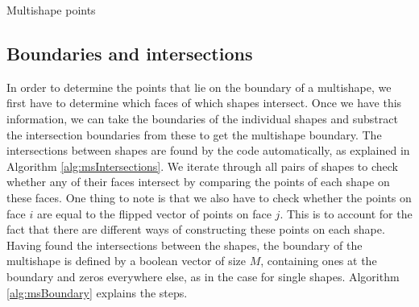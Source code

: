 \begin{algorithm}[H]	\label{alg:msPts}
	\SetAlgoLined
\caption{Multishape points}
\end{algorithm}

\subsection{Boundaries and intersections}
In order to  determine the points that lie on the boundary of a multishape, we first have to determine which faces of which shapes intersect. Once we have this information, we can take the boundaries of the individual shapes and substract the intersection boundaries from these to get the multishape boundary.
The intersections between shapes are found by the code automatically, as explained in Algorithm \ref{alg:msIntersections}. We iterate through all pairs of shapes to check whether any of their faces intersect by comparing the points of each shape on these faces. One thing to note is that we also have to check whether the points on face $i$ are equal to the flipped vector of points on face $j$. This is to account for the fact that there are different ways of constructing these points on each shape.
Having found the intersections between the shapes, the boundary of the multishape is defined by a boolean vector of size $M$, containing ones at the boundary and zeros everywhere else, as in the case for single shapes. Algorithm \ref{alg:msBoundary} explains the steps.

